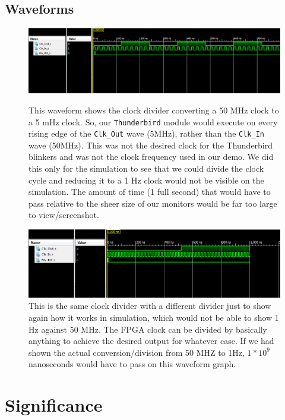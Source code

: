 \documentclass[12pt]{report}
\begin{document}
	\subsection*{Waveforms}
	\hfill
		\begin{figure}[h]
		\begin{center}
			\includegraphics[scale=.55]{tb_5.PNG}
			\caption{This waveform shows the clock divider converting a 50 MHz clock
			to a 5 mHz clock. So, our \texttt{Thunderbird} module would execute on every rising edge of the \texttt{Clk\_Out} wave (5MHz), rather than the \texttt{Clk\_In} wave (50MHz). This was not the desired clock for the Thunderbird blinkers
			and was not the clock frequency used in our demo.  We did this only for the 
			simulation to see that we could divide the clock cycle and reducing it to a 1 Hz 
			clock would not be visible on the simulation. The amount of time (1 full second) that would have to pass relative to the sheer size of our monitors would be far too large to view/screenshot.}

			\hfill
 
			\includegraphics[scale=.67]{tb_25.PNG}
			\caption{This is the same clock divider with a different divider just to show again
			how it works in simulation, which would not be able to show 1 Hz against 50 MHz. The FPGA clock can be divided by basically anything to achieve the desired output for whatever case. If we had shown the actual conversion/division from 50 MHZ to 1Hz, $1*10^9$ nanoseconds would have to pass on this waveform graph.}
		\end{center}
		\end{figure}
\newpage
\section*{Significance}
\end{document}
